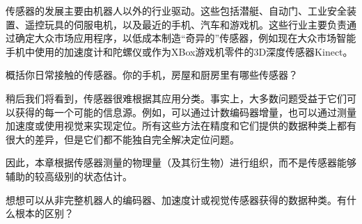 传感器的发展主要由机器人以外的行业驱动。这些包括潜艇、自动门、工业安全装置、遥控玩具的伺服电机，以及最近的手机、汽车和游戏机。这些行业主要负责通过确定大众市场应用程序，以低成本制造“奇异的”传感器，例如现在大众市场智能手机中使用的加速度计和陀螺仪或作为XBox游戏机零件的3D深度传感器Kinect。

\begin{framed}

概括你日常接触的传感器。你的手机，房屋和厨房里有哪些传感器？
\end{framed}



稍后我们将看到，传感器很难根据其应用分类。事实上，大多数问题受益于它们可以获得的每一个可能的信息源。例如，可以通过计数编码器增量，也可以通过测量加速度或使用视觉来实现定位。所有这些方法在精度和它们提供的数据种类上都有很大的差异，但是它们都不能独自完全解决定位问题。


因此，本章根据传感器测量的物理量（及其衍生物）进行组织，而不是传感器能够辅助的较高级别的状态估计。

\begin{framed}

想想可以从非完整机器人的编码器、加速度计或视觉传感器获得的数据种类。有什么根本的区别？
\end{framed}

